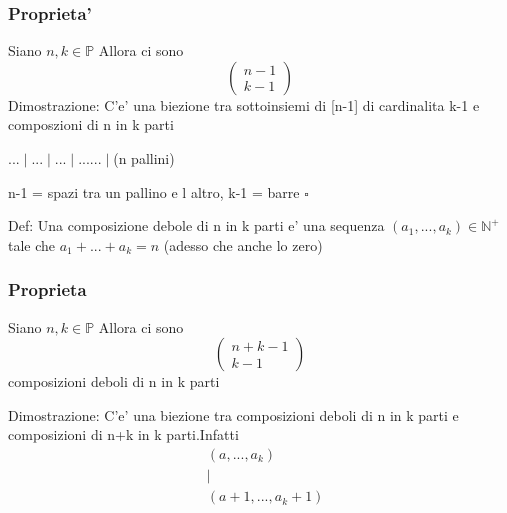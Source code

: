 \documentclass{article}
\begin{document}
        \subsubsection{Proprieta'}
        \begin{flushleft}
          Siano $n,k \in \mathbb{P}$ Allora ci sono
          \begin{equation}
            \begin{pmatrix}
              n-1 \\ 
              k-1
            \end{pmatrix}
          \end{equation}
          Dimostrazione: C'e' una biezione tra sottoinsiemi di [n-1] di cardinalita k-1 e composzioni di n in k parti
        \end{flushleft}
        \begin{flushleft}
          $...\mid ... \mid ...\mid ...... \mid $(n pallini)
        \end{flushleft}
        n-1 =  spazi tra un pallino e l altro, k-1 = barre $\square$
        \begin{flushleft}
          Def: Una composizione debole di n in k parti e' una sequenza $(a_1,...,a_k) \in \mathbb{N}^+$ tale che $a_1+...+a_k=n$ (adesso che anche lo zero)
        \end{flushleft}
        \subsubsection{Proprieta}
        \begin{flushleft}
          Siano $n,k \in \mathbb{P}$ Allora ci sono 
          \begin{equation}
            \begin{pmatrix}
              n+k-1 \\ 
              k-1
            \end{pmatrix}
          \end{equation}
          composizioni deboli di n in k parti
        \end{flushleft}
        \begin{flushleft}
          Dimostrazione: C'e' una biezione tra composizioni deboli di n in k parti e composizioni di n+k in k parti.Infatti 
          \begin{equation}
            \begin{split}
              & (a,...,a_k) \\
              & \mid \\ 
              & (a+1,...,a_k+1)
            \end{split}
          \end{equation}
        \end{flushleft}
\end{document}
